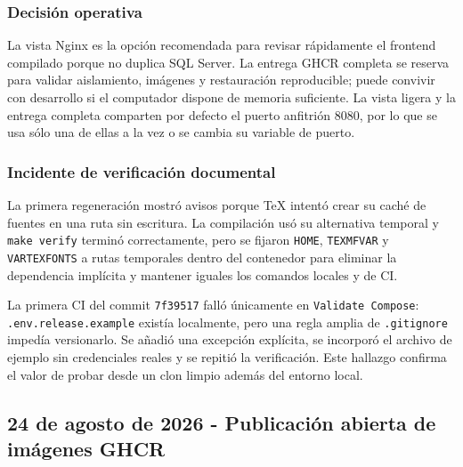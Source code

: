 \documentclass[11pt,letterpaper]{article}
\newcommand{\file}[1]{\texttt{#1}}
\begin{document}
\subsubsection{Decisión operativa}

La vista Nginx es la opción recomendada para revisar rápidamente el frontend compilado porque no duplica SQL Server. La entrega GHCR completa se reserva para validar aislamiento, imágenes y restauración reproducible; puede convivir con desarrollo si el computador dispone de memoria suficiente. La vista ligera y la entrega completa comparten por defecto el puerto anfitrión 8080, por lo que se usa sólo una de ellas a la vez o se cambia su variable de puerto.

\subsubsection{Incidente de verificación documental}

La primera regeneración mostró avisos porque TeX intentó crear su caché de fuentes en una ruta sin escritura. La compilación usó su alternativa temporal y \file{make verify} terminó correctamente, pero se fijaron \file{HOME}, \file{TEXMFVAR} y \file{VARTEXFONTS} a rutas temporales dentro del contenedor para eliminar la dependencia implícita y mantener iguales los comandos locales y de CI.

La primera CI del commit \file{7f39517} falló únicamente en \file{Validate Compose}: \file{.env.release.example} existía localmente, pero una regla amplia de \file{.gitignore} impedía versionarlo. Se añadió una excepción explícita, se incorporó el archivo de ejemplo sin credenciales reales y se repitió la verificación. Este hallazgo confirma el valor de probar desde un clon limpio además del entorno local.

\clearpage
\subsection{24 de agosto de 2026 - Publicación abierta de imágenes GHCR}
\end{document}
